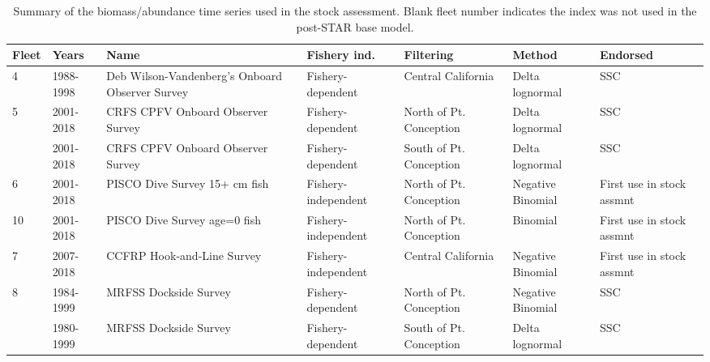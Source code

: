 \documentclass[12pt,]{article}
\begin{document}
\begin{landscape}
\begin{table}[ht]
\centering
\caption{Summary of the biomass/abundance
                                              time series used in the stock
                                              assessment. Blank fleet number indicates 
                                              the index was not used in the post-STAR base 
                                              model.} 
\label{tab:Index_summary}
\begin{tabular}{>{\raggedright}p{.8in}>{\raggedright}p{1in}>{\raggedright}p{2in}>{\raggedright}p{1.3in}>{\raggedright}p{1in}>{\raggedright}p{1in}>{\raggedright}p{1in}}
  \hline
Fleet & Years & Name & Fishery ind. & Filtering & Method & Endorsed \\ 
  \hline
4 & 1988-1998 & Deb Wilson-Vandenberg's Onboard Observer Survey & Fishery-dependent & Central California & Delta lognormal & SSC \\ 
  5 & 2001-2018 & CRFS CPFV Onboard Observer Survey & Fishery-dependent & North of Pt. Conception & Delta lognormal & SSC \\ 
   & 2001-2018 & CRFS CPFV Onboard Observer Survey & Fishery-dependent & South of Pt. Conception & Delta lognormal & SSC \\ 
  6 & 2001-2018 & PISCO Dive Survey 15+ cm fish & Fishery-independent & North of Pt. Conception & Negative Binomial & First use in stock assmnt \\ 
  10 & 2001-2018 & PISCO Dive Survey age=0 fish & Fishery-independent & North of Pt. Conception & Binomial & First use in stock assmnt \\ 
  7 & 2007-2018 & CCFRP Hook-and-Line Survey & Fishery-independent & Central California & Negative Binomial & First use in stock assmnt \\ 
  8 & 1984-1999 & MRFSS Dockside Survey & Fishery-dependent & North of Pt. Conception & Negative Binomial & SSC \\ 
   & 1980-1999 & MRFSS Dockside Survey & Fishery-dependent & South of Pt. Conception & Delta lognormal & SSC \\ 
   \hline
\end{tabular}
\end{table}
\end{landscape}
\end{document}

